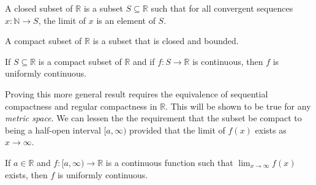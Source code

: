             \begin{definition}
                A closed subset of $\mathbb{R}$ is a subset
                $S\subseteq\mathbb{R}$ such that for all
                convergent sequences
                $x:\mathbb{N}\rightarrow{S}$, the limit of
                $x$ is an element of $S$.
            \end{definition}
            \begin{definition}
                A compact subset of $\mathbb{R}$ is a subset
                that is closed and bounded.
            \end{definition}
            \begin{theorem}
                If $S\subseteq\mathbb{R}$ is a compact subset
                of $\mathbb{R}$ and if
                $f:S\rightarrow\mathbb{R}$ is continuous,
                then $f$ is uniformly continuous.
            \end{theorem}
            Proving this more general result requires
            the equivalence of sequential compactness and
            regular compactness in $\mathbb{R}$. This will be
            shown to be true for any \textit{metric space}.
            We can lessen the the requirement that
            the subset be compact to being a
            half-open interval $[a,\infty)$ provided that
            the limit of $f(x)$ exists as
            $x\rightarrow\infty$.
            \begin{theorem}
                If $a\in\mathbb{R}$ and
                $f:[a,\infty)\rightarrow\mathbb{R}$ is
                a continuous function such that
                $\lim_{x\rightarrow\infty}f(x)$ exists,
                then $f$ is uniformly continuous.
            \end{theorem}
